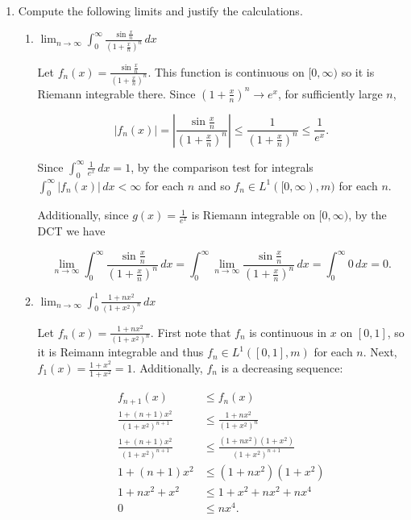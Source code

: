 \documentclass[11pt,oneside,english]{amsart}
\theoremstyle{definition}
\newcommand{\lom}[2]{\lim_{{#1}\rightarrow{#2}}}
\begin{document}
\begin{enumerate}
\begin{enumerate}
\begin{proof}
Thus, $f(x)\in L^1([0,\infty),m)$, and it is equal to $\log\left(\frac{a}{b}\right)$.
\end{proof}

\end{enumerate}

\item Compute the following limits and justify the calculations.

\begin{enumerate}

\item $\displaystyle \lom{n}{\infty}\int_0^\infty \frac{\sin\frac{x}{n}}{\left(1+\frac{x}{n}\right)^n}\,dx$

Let $f_n(x)=\frac{\sin\frac{x}{n}}{\left(1+\frac{x}{n}\right)^n}$. This function is continuous on $[0,\infty)$ so it is Riemann integrable there. Since $\left(1+\frac{x}{n}\right)^n\rightarrow e^x$, for sufficiently large $n$,

\[
|f_n(x)|=\left|\frac{\sin\frac{x}{n}}{\left(1+\frac{x}{n}\right)^n}\right|\leq\frac{1}{\left(1+\frac{x}{n}\right)^n}\leq \frac{1}{e^x}.
\]

Since $\int_0^\infty \frac{1}{e^x}\,dx=1$, by the comparison test for integrals $\int_0^\infty|f_n(x)|\,dx<\infty$ for each $n$ and so $f_n\in L^1([0,\infty),m)$ for each $n$.

Additionally, since $g(x)=\frac{1}{e^x}$ is Riemann integrable on $[0,\infty)$, by the DCT we have

\[
\lom{n}{\infty}\int_0^\infty \frac{\sin\frac{x}{n}}{\left(1+\frac{x}{n}\right)^n}\,dx=\int_0^\infty \lom{n}{\infty}\frac{\sin\frac{x}{n}}{\left(1+\frac{x}{n}\right)^n}\,dx=\int_0^\infty0\,dx=0.
\]

\item $\displaystyle \lom{n}{\infty}\int_0^1\frac{1+nx^2}{(1+x^2)^n}\,dx$

Let $f_n(x)=\frac{1+nx^2}{(1+x^2)^n}$. First note that $f_n$ is continuous in $x$ on $[0,1]$, so it is Reimann integrable and thus $f_n\in L^1([0,1],m)$ for each $n$. Next, $f_1(x)=\frac{1+x^2}{1+x^2}=1$. Additionally, $f_n$ is a decreasing sequence:

\begin{align*}
f_{n+1}(x)&\leq f_n(x)\\[2mm]
\frac{1+(n+1)x^2}{(1+x^2)^{n+1}}&\leq \frac{1+nx^2}{(1+x^2)^n}\\[2mm]
\frac{1+(n+1)x^2}{(1+x^2)^{n+1}}&\leq \frac{(1+nx^2)(1+x^2)}{(1+x^2)^{n+1}}\\[2mm]
1+(n+1)x^2&\leq (1+nx^2)(1+x^2)\\[2mm]
1+nx^2+x^2&\leq 1+x^2+nx^2+nx^4\\[2mm]
0&\leq nx^4.
\end{align*}


\end{enumerate}
\end{enumerate}
\end{document}
